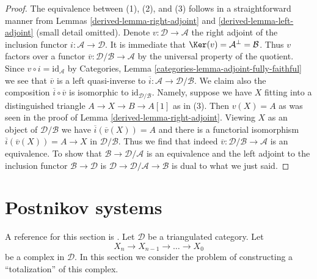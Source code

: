 \begin{proof}

The equivalence between (1), (2), and (3) follows in a straightforward manner
from Lemmas \ref{derived-lemma-right-adjoint} and \ref{derived-lemma-left-adjoint} (small
detail omitted). Denote $v : \mathcal{D} \to \mathcal{A}$ the right
adjoint of the inclusion functor $i : \mathcal{A} \to \mathcal{D}$.
It is immediate that $\Ker(v) = \mathcal{A}^\perp = \mathcal{B}$.
Thus $v$ factors over a functor
$\overline{v} : \mathcal{D}/\mathcal{B} \to \mathcal{A}$
by the universal property of the quotient. Since
$v \circ i = \text{id}_\mathcal{A}$ by
Categories, Lemma \ref{categories-lemma-adjoint-fully-faithful}
we see that $\overline{v}$ is a left quasi-inverse to
$\overline{i} : \mathcal{A} \to \mathcal{D}/\mathcal{B}$.
We claim also the composition $\overline{i} \circ \overline{v}$
is isomorphic to $\text{id}_{\mathcal{D}/\mathcal{B}}$.
Namely, suppose we have $X$ fitting into a distinguished triangle
$A \to X \to B \to A[1]$ as in (3). Then $v(X) = A$ as was seen
in the proof of Lemma \ref{derived-lemma-right-adjoint}.
Viewing $X$ as an object of $\mathcal{D}/\mathcal{B}$
we have $\overline{i}(\overline{v}(X)) = A$ and there
is a functorial isomorphism $\overline{i}(\overline{v}(X)) = A \to X$
in $\mathcal{D}/\mathcal{B}$. Thus we find that indeed
$\overline{v} : \mathcal{D}/\mathcal{B} \to \mathcal{A}$
is an equivalence. To show that
$\mathcal{B} \to \mathcal{D}/\mathcal{A}$ is an equivalence and
the left adjoint to the inclusion functor $\mathcal{B} \to \mathcal{D}$
is $\mathcal{D} \to \mathcal{D}/\mathcal{A} \to \mathcal{B}$
is dual to what we just said.
\end{proof}

\section{Postnikov systems}
\label{derived-section-postnikov}
A reference for this section is \cite{Orlov-K3}. Let $\mathcal{D}$
be a triangulated category. Let
$$
X_n \to X_{n - 1} \to \ldots \to X_0
$$
be a complex in $\mathcal{D}$. In this section we consider the problem
of constructing a ``totalization'' of this complex.

